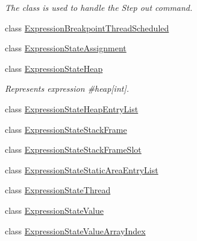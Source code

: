 \begin{DoxyCompactItemize}
\begin{DoxyCompactList}\small\item\em The class is used to handle the Step out command. \end{DoxyCompactList}\item 
class \hyperlink{classgov_1_1nasa_1_1jpf_1_1inspector_1_1server_1_1expression_1_1expressions_1_1_expression_breakpoint_thread_scheduled}{Expression\+Breakpoint\+Thread\+Scheduled}
\item 
class \hyperlink{classgov_1_1nasa_1_1jpf_1_1inspector_1_1server_1_1expression_1_1expressions_1_1_expression_state_assignment}{Expression\+State\+Assignment}
\item 
class \hyperlink{classgov_1_1nasa_1_1jpf_1_1inspector_1_1server_1_1expression_1_1expressions_1_1_expression_state_heap}{Expression\+State\+Heap}
\begin{DoxyCompactList}\small\item\em Represents expression \#heap\mbox{[}int\mbox{]}. \end{DoxyCompactList}\item 
class \hyperlink{classgov_1_1nasa_1_1jpf_1_1inspector_1_1server_1_1expression_1_1expressions_1_1_expression_state_heap_entry_list}{Expression\+State\+Heap\+Entry\+List}
\item 
class \hyperlink{classgov_1_1nasa_1_1jpf_1_1inspector_1_1server_1_1expression_1_1expressions_1_1_expression_state_stack_frame}{Expression\+State\+Stack\+Frame}
\item 
class \hyperlink{classgov_1_1nasa_1_1jpf_1_1inspector_1_1server_1_1expression_1_1expressions_1_1_expression_state_stack_frame_slot}{Expression\+State\+Stack\+Frame\+Slot}
\item 
class \hyperlink{classgov_1_1nasa_1_1jpf_1_1inspector_1_1server_1_1expression_1_1expressions_1_1_expression_state_static_area_entry_list}{Expression\+State\+Static\+Area\+Entry\+List}
\item 
class \hyperlink{classgov_1_1nasa_1_1jpf_1_1inspector_1_1server_1_1expression_1_1expressions_1_1_expression_state_thread}{Expression\+State\+Thread}
\item 
class \hyperlink{classgov_1_1nasa_1_1jpf_1_1inspector_1_1server_1_1expression_1_1expressions_1_1_expression_state_value}{Expression\+State\+Value}
\item 
class \hyperlink{classgov_1_1nasa_1_1jpf_1_1inspector_1_1server_1_1expression_1_1expressions_1_1_expression_state_value_array_index}{Expression\+State\+Value\+Array\+Index}
\item 

\end{DoxyCompactItemize}
